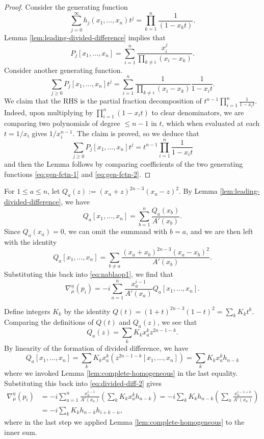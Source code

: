 \documentclass[reqno]{amsart}
\numberwithin{equation}{subsection}
\theoremstyle{definition}
\newcommand{\nablaop}{\nabla^{\eta}_{\mu}}
\begin{document}
\begin{proof}
Consider the generating function 
\begin{equation}\label{eq:gen-fctn-1}
\sum_{j=0}^\infty h_j(x_1, \ldots, x_n) t^j = \prod_{k=1}^n \frac{1}{ (1-x_k t)}.
\end{equation}
Lemma \ref{lem:leading-divided-difference} implies that 
\[
P_j[x_1, \ldots, x_n] = \sum_{i=1}^n \frac{x_i^j}{\prod_{k \neq i} (x_i-x_k)}.
\]
Consider another generating function. 
\[
\sum_{j \geq 0} P_j[x_1, \ldots, x_n] t^j = \sum_{i=1}^n \frac{1}{\prod_{k \neq i} (x_i-x_k)} \frac{1}{1-x_it} .
\]
We claim that the RHS is the partial fraction decomposition of $t^{n-1}\prod_{i=1}^n \frac{1}{1-x_i t}$. Indeed, upon multiplying by $\prod_{i=1}^n (1-x_i t)$ to clear denominators, we are comparing two polynomials of degree $\leq n-1$ in $t$, which when evaluated at each $t=1/x_i$ gives $1/x_i^{n-1}$. The claim is proved, so we deduce that 
\begin{equation}\label{eq:gen-fctn-2}
\sum_{j \geq 0} P_j[x_1, \ldots, x_n] t^j = t^{n-1}\prod_{i=1}^n \frac{1}{1-x_i t}
\end{equation}
and then the Lemma follows by comparing coefficients of the two generating functions \eqref{eq:gen-fctn-1} and \eqref{eq:gen-fctn-2}.
\end{proof}

For $1 \leq a \leq n$, let $Q_a(z) := (x_a+z)^{2n-3}(x_a-z)^2$. By Lemma \ref{lem:leading-divided-difference}, we have
\[
Q_a[x_1, \ldots, x_n] = \sum_{b=1}^n \frac{Q_a(x_b)}{A'(x_b)}. 
\]
Since $Q_a(x_a) = 0$, we can omit the summand with $b = a$, and we are then left with the identity 
\begin{equation}\label{eq:divided-diff-1}
Q_a[x_1, \ldots, x_n] = \sum_{b \ne a} \frac{(x_a+x_b)^{2n-3}(x_a-x_b)^2}{A'(x_b)}.
\end{equation}
Substituting this back into \eqref{eq:nablaop1}, we find that
\begin{equation}\label{eq:divided-diff-2}
\nablaop(p_i) = -i \sum_{a=1}^n \frac{x_a^{i-1}}{A'(x_a)} Q_a[x_1, \ldots, x_n].
\end{equation}

Define integers $K_k$ by the identity $Q(t) = (1+t)^{2n-3}(1-t)^2 = \sum_k K_k t^k$. Comparing the definitions of $Q(t)$ and $Q_a(z)$, we see that 
\begin{equation}\label{eq:Q_a-expansion}
Q_a(z) = \sum_k K_k x_a^k z^{2n-1-k}.
\end{equation}
By linearity of the formation of divided difference, we have
\[
Q_a[x_1, \ldots, x_n] = \sum_k K_k x_a^k ( z^{2n-1-k}[x_1, \ldots, x_n]) = \sum_k K_k x_a^k h_{n-k} 
\]
where we invoked Lemma \ref{lem:complete-homogeneous} in the last equality. Substituting this back into \eqref{eq:divided-diff-2} gives 
\begin{align}\label{eq:gemini-nablaop}
\nablaop(p_i) & = -i \sum_{a=1}^n \frac{x_a^{i-1}}{A'(x_a)}  \left(\sum_k K_k x_a^k h_{n-k}\right) = -i \sum_k K_k h_{n-k} \left(\sum_a \frac{x_a^{i-1+k}}{A'(x_a)}\right) \nonumber \\
& = -i \sum_k K_k h_{n-k} h_{i+k-n},
\end{align}
where in the last step we applied Lemma \ref{lem:complete-homogeneous} to the inner sum. 
\end{document}
